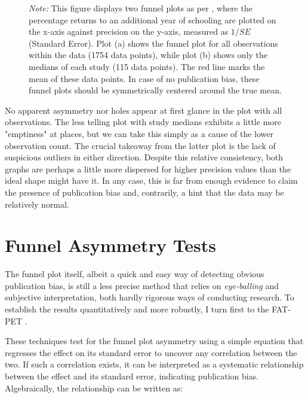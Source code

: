 \begin{figure}[!t]
\begin{center}
\begin{subfigure}[b]{0.45\textwidth}
      \label{fig:funnel_plot_medians}
    \end{subfigure}
  \end{center}\vspace{-0.6cm}
  \captionsetup{width=0.85\textwidth, font = scriptsize}
  \caption*{\emph{Note:} This figure displays two funnel plots as per \cite{Egger1997}, where the percentage returns to an additional year of schooling are plotted on the x-axis against precision on the y-axis, measured as $1/SE$ (Standard Error). Plot (a) shows the funnel plot for all observations within the data (1754 data points), while plot (b) shows only the medians of each study (115 data points). The red line marks the mean of these data points. In case of no publication bias, these funnel plots should be symmetrically centered around the true mean.}
\end{figure}

No apparent asymmetry nor holes appear at first glance in the plot with all observations. The less telling plot with study medians exhibits a little more "emptiness" at places, but we can take this simply as a cause of the lower observation count. The crucial takeaway from the latter plot is the lack of suspicious outliers in either direction. Despite this relative consistency, both graphs are perhaps a little more dispersed for higher precision values than the ideal shape might have it. In any case, this is far from enough evidence to claim the presence of publication bias and, contrarily, a hint that the data may be relatively normal.


\section{Funnel Asymmetry Tests}
\label{sec:linear_tests}


The funnel plot itself, albeit a quick and easy way of detecting obvious publication bias, is still a less precise method that relies on \textit{eye-balling} and subjective interpretation, both hardly rigorous ways of conducting research. To establish the results quantitatively and more robustly, I turn first to the \ac{FAT-PET} \citep{Egger1997, stanley2005beyond, stanley2008fatpet}.

These techniques test for the funnel plot asymmetry using a simple equation that regresses the effect on its standard error to uncover any correlation between the two. If such a correlation exists, it can be interpreted as a systematic relationship between the effect and its standard error, indicating publication bias. Algebraically, the relationship can be written as:

